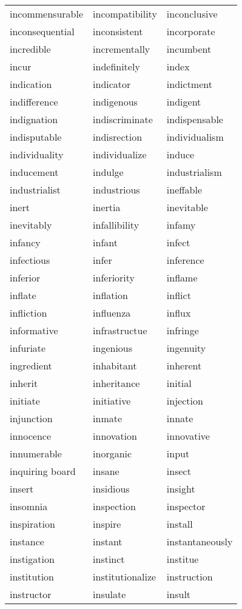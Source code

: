 \documentclass{minimal}
\begin{document}
\begin{longtable}{p{2.8cm}p{2.8cm}p{2.8cm}}
incommensurable & incompatibility & inconclusive \\
inconsequential & inconsistent & incorporate \\
incredible & incrementally & incumbent \\
incur & indefinitely & index \\
indication & indicator & indictment \\
indifference & indigenous & indigent \\
indignation & indiscriminate & indispensable \\
indisputable & indisrection & individualism \\
individuality & individualize & induce \\
inducement & indulge & industrialism \\
industrialist & industrious & ineffable \\
inert & inertia & inevitable \\
inevitably & infallibility & infamy \\
infancy & infant & infect \\
infectious & infer & inference \\
inferior & inferiority & inflame \\
inflate & inflation & inflict \\
infliction & influenza & influx \\
informative & infrastructue & infringe \\
infuriate & ingenious & ingenuity \\
ingredient & inhabitant & inherent \\
inherit & inheritance & initial \\
initiate & initiative & injection \\
injunction & inmate & innate \\
innocence & innovation & innovative \\
innumerable & inorganic & input \\
inquiring board & insane & insect \\
insert & insidious & insight \\
insomnia & inspection & inspector \\
inspiration & inspire & install \\
instance & instant & instantaneously \\
instigation & instinct & institue \\
institution & institutionalize & instruction \\
instructor & insulate & insult \\

\end{longtable}
\end{document}
